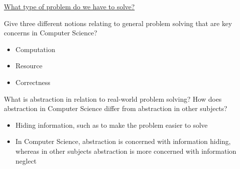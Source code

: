 \documentclass{exam}
\begin{document}
\begin{center}
	\underline{\huge What type of problem do we have to solve?}
\end{center}
\begin{questions}

\question[3]Give three different notions relating to general problem solving that are key concerns in Computer Science?
\begin{solution}[2in]
	\begin{itemize}
		\item Computation
		\item Resource
		\item Correctness
	\end{itemize}
\end{solution}

\question[4]What is abstraction in relation to real-world problem solving? How does abstraction in Computer Science differ from abstraction in other subjects? 
\begin{solution}[2in]
	\begin{itemize}
		\item Hiding information, such as to make the problem easier to solve
		\item In Computer Science, abstraction is concerned with information hiding, whereas in other subjects abstraction is more concerned with information neglect
	\end{itemize}
\end{solution}


\end{questions}
\end{document}
